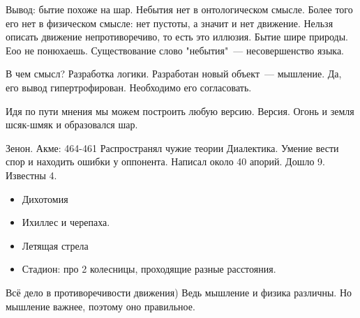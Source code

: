 Вывод: бытие похоже на шар. 
Небытия нет в онтологическом смысле. Более того его нет в физическом смысле: нет пустоты, а значит и нет движение. Нельзя описать движение непротиворечиво, то есть это иллюзия. 
Бытие шире природы. Еоо не понюхаешь. 
Существование слово "небытия"~--- несовершенство языка. 

В чем смысл? Разработка логики. Разработан новый объект~--- мышление. Да, его вывод гипертрофирован. Необходимо его согласовать. 

Идя по пути мнения мы можем построить любую версию. 
Версия. Огонь и земля шсяк-шмяк и образовался шар. 

Зенон. Акме: 464-461 
Распространял чужие теории
Диалектика. Умение вести спор и находить ошибки у оппонента. Написал около 40 апорий. Дошло 9. Известны 4. 

\begin{itemize}
	\item Дихотомия
	\item Ихиллес и черепаха. 
	\item Летящая стрела
	\item Стадион: про 2 колесницы, проходящие разные расстояния. 
\end{itemize}

Всё дело в противоречивости движения) Ведь мышление и физика различны. Но мышление важнее, поэтому оно правильное. 
